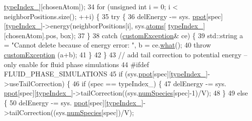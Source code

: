 \begin{DoxyCode}
      \hyperlink{classmc_move_acb731965547b0326ef318ec96da8b46a}{typeIndex\_}][chosenAtom]);
34         \textcolor{keywordflow}{for} (\textcolor{keywordtype}{unsigned} \textcolor{keywordtype}{int} i = 0; i < neighborPositions.size(); ++i) \{
35             \textcolor{keywordflow}{try} \{
36                                                                 delEnergy -= sys.
      \hyperlink{classsim_system_a8d6271751a62f61edcf57f773540a4a3}{ppot}[spec][\hyperlink{classmc_move_acb731965547b0326ef318ec96da8b46a}{typeIndex\_}]->energy(neighborPositions[i], sys.\hyperlink{classsim_system_a90421b19082f7fb8fc23b7264b1161e4}{atoms}[
      \hyperlink{classmc_move_acb731965547b0326ef318ec96da8b46a}{typeIndex\_}][chosenAtom].pos, box);
37                                                 \}
38                                                 \textcolor{keywordflow}{catch} (\hyperlink{classcustom_exception}{customException}& ce) \{
39                                                                 std::string a = \textcolor{stringliteral}{"Cannot delete because of
       energy error: "}, b = ce.\hyperlink{classcustom_exception_aeb6ab5848b038adfc68fde86a512f691}{what}();
40                                                                 \textcolor{keywordflow}{throw} 
      \hyperlink{classcustom_exception}{customException} (a+b);
41                                                 \}
42         \}
43         \textcolor{comment}{// add tail correction to potential energy -- only enable for fluid phase simulations}
44 \textcolor{preprocessor}{#ifdef FLUID\_PHASE\_SIMULATIONS}
45         \textcolor{keywordflow}{if} (sys.\hyperlink{classsim_system_a8d6271751a62f61edcf57f773540a4a3}{ppot}[spec][\hyperlink{classmc_move_acb731965547b0326ef318ec96da8b46a}{typeIndex\_}]->useTailCorrection) \{
46                 \textcolor{keywordflow}{if} (spec == typeIndex\_) \{
47                                                                 delEnergy -= sys.
      \hyperlink{classsim_system_a8d6271751a62f61edcf57f773540a4a3}{ppot}[spec][\hyperlink{classmc_move_acb731965547b0326ef318ec96da8b46a}{typeIndex\_}]->tailCorrection((sys.\hyperlink{classsim_system_a9eea865e6dc1cff377b1e79c4d9c23f0}{numSpecies}[spec]-1)/V);
48                                                 \}
49                                                 \textcolor{keywordflow}{else} \{
50                                                                 delEnergy -= sys.
      \hyperlink{classsim_system_a8d6271751a62f61edcf57f773540a4a3}{ppot}[spec][\hyperlink{classmc_move_acb731965547b0326ef318ec96da8b46a}{typeIndex\_}]->tailCorrection((sys.\hyperlink{classsim_system_a9eea865e6dc1cff377b1e79c4d9c23f0}{numSpecies}[spec])/V);

\end{DoxyCode}
